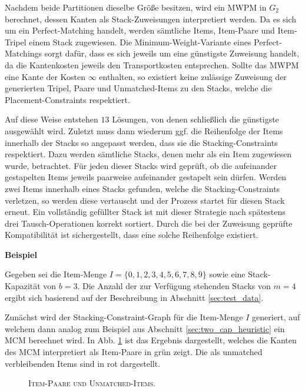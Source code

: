 Nachdem beide Partitionen dieselbe Größe besitzen, wird ein \textsc{MWPM} in $G_2$ berechnet, dessen Kanten
als Stack-Zuweisungen interpretiert werden. Da es sich um ein Perfect-Matching handelt, werden sämtliche Items, Item-Paare
und Item-Tripel einem Stack zugewiesen. Die Minimum-Weight-Variante eines Perfect-Matchings sorgt dafür, dass es sich
jeweils um eine günstigste Zuweisung handelt, da die Kantenkosten jeweils den Transportkosten entsprechen.
Sollte das \textsc{MWPM} eine Kante der Kosten $\infty$ enthalten, so existiert keine zulässige Zuweisung
der generierten Tripel, Paare und Unmatched-Items zu den Stacks, welche die Placement-Constraints respektiert.

Auf diese Weise entstehen $13$ Lösungen, von denen schließlich die günstigste ausgewählt wird.
Zuletzt muss dann wiederum ggf. die Reihenfolge der Items innerhalb der Stacks so angepasst werden,
dass sie die Stacking-Constraints respektiert. Dazu werden sämtliche Stacks, denen mehr als
ein Item zugewiesen wurde, betrachtet. Für jeden dieser Stacks wird geprüft, ob die aufeinander
gestapelten Items jeweils paarweise aufeinander gestapelt sein dürfen.
Werden zwei Items innerhalb eines Stacks gefunden, welche die Stacking-Constraints verletzen, so werden diese
vertauscht und der Prozess startet für diesen Stack erneut. Ein vollständig gefüllter Stack ist mit dieser
Strategie nach spätestens drei Tausch-Operationen korrekt sortiert. Durch die bei der Zuweisung geprüfte
Kompatibilität ist sichergestellt, dass eine solche Reihenfolge existiert.

\textbf{Beispiel}

Gegeben sei die Item-Menge $I = \{0, 1, 2, 3, 4, 5, 6, 7, 8, 9\}$ sowie eine Stack-Kapazität von $b = 3$. Die Anzahl der
zur Verfügung stehenden Stacks von $m = 4$ ergibt sich basierend auf der Beschreibung in Abschnitt \ref{sec:test_data}.

Zunächst wird der Stacking-Constraint-Graph für die Item-Menge $I$ generiert, auf welchem dann analog zum Beispiel aus Abschnitt
\ref{sec:two_cap_heuristic} ein \textsc{MCM} berechnet wird. In Abb. \ref{fig:pairs_and_unmatched} ist das Ergebnis dargestellt,
welches die Kanten des \textsc{MCM} interpretiert als Item-Paare in grün zeigt. Die als unmatched verbleibenden Items sind in rot dargestellt.

\begin{figure}[H]
\centering
{}
\caption{\textsc{Item-Paare und Unmatched-Items.}}
\label{fig:pairs_and_unmatched}
\end{figure}

